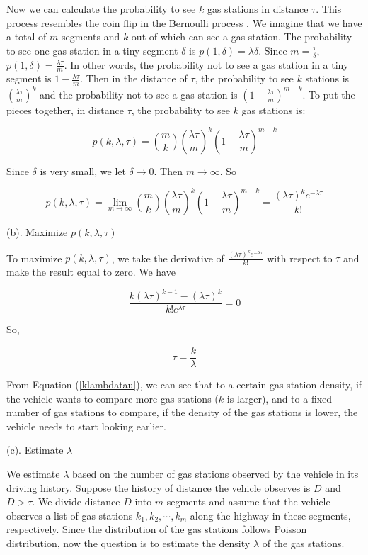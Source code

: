 \documentclass[conference]{IEEEtran}
\theoremstyle{definition}
\begin{document}
Now we can calculate the probability to see $k$ gas stations in distance $\tau$. This process resembles the coin flip in the Bernoulli process \cite{Bernoulli}. We imagine that we have a total of $m$ segments and $k$ out of which can see a gas station. The probability to see one gas station in a tiny segment $\delta$ is $p(1,\delta)=\lambda \delta$. Since $m = \frac{\tau}{\delta}$, $p(1, \delta)= \frac{\lambda \tau}{m}$. In other words, the probability not to see a gas station in a tiny segment is $1-\frac{\lambda \tau}{m}$. Then in the distance of $\tau$, the probability to see $k$ stations is $(\frac{\lambda \tau}{m})^{k}$ and the probability not to see a gas station is $(1-\frac{\lambda \tau}{m})^{m-k}$. To put the pieces together, in  distance $\tau$, the probability to see $k$ gas stations is:

\[p(k, \lambda, \tau) = \binom{m}{k}  (\frac{\lambda \tau}{m})^{k}(1-\frac{\lambda \tau}{m})^{m-k} \]

Since $\delta$ is very small, we let $\delta \rightarrow 0$. Then $m \rightarrow \infty$. So

\begin{equation} \label{ppdf}
p(k, \lambda, \tau) =\lim_{m \rightarrow \infty} \binom{m}{k}  (\frac{\lambda \tau}{m})^{k}(1-\frac{\lambda \tau}{m})^{m-k} = \frac{(\lambda \tau)^{k} e^{-\lambda \tau}}{k!}
\end{equation}

\noindent (b). Maximize $p(k, \lambda, \tau)$

To maximize $p(k, \lambda, \tau)$, we take the derivative of $\frac{(\lambda \tau)^{k} e^{-\lambda \tau}}{k!}$ with respect to $\tau$ and make the result equal to zero. We have

\[ \frac{k(\lambda \tau)^{k-1}-(\lambda \tau)^k} {k! e^{\lambda \tau}} =0 \]

So,

\begin{equation}\label{klambdatau}
  \tau = \frac{k}{\lambda}
\end{equation}

From Equation (\ref{klambdatau}), we can see that to a certain gas station density, if the vehicle wants to compare more gas stations ($k$ is larger), and to a fixed number of gas stations to compare, if the density of the gas stations is lower, the vehicle needs to start looking earlier.

\noindent (c). Estimate   $\lambda$

We estimate $\lambda$ based on the number of gas stations observed by the vehicle in its driving history. Suppose the history of distance the vehicle observes is $D$ and $D>\tau$. We divide distance $D$ into $m$ segments and assume that the vehicle observes a list of gas stations $k_1, k_2, \cdots, k_m $ along the highway in these segments, respectively. Since the distribution of the gas stations follows Poisson distribution,  now the question is to estimate the density $\lambda$  of the gas stations.
\end{document}
